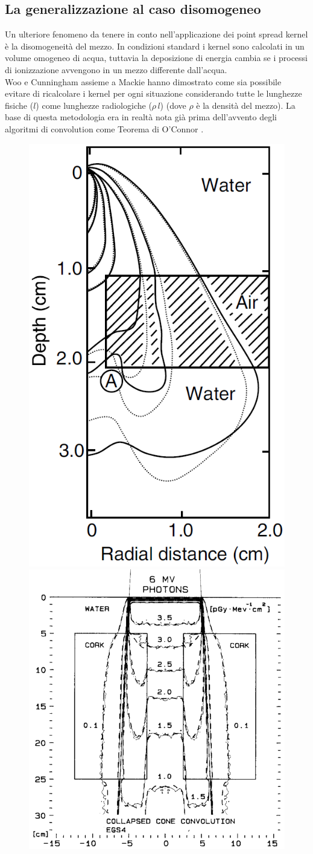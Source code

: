 {\subsection{La generalizzazione al caso disomogeneo}
Un ulteriore fenomeno da tenere in conto nell'applicazione dei point spread kernel è la disomogeneità del mezzo. In condizioni standard i kernel sono calcolati in un volume omogeneo di acqua, tuttavia la deposizione di energia cambia se i processi di ionizzazione avvengono in un mezzo differente dall'acqua.\\
Woo e Cunningham \cite{Woo1990} assieme a Mackie \cite{Mackie1985} hanno dimostrato come sia possibile evitare di ricalcolare i kernel per ogni situazione considerando tutte le lunghezze fisiche ($l$) come lunghezze radiologiche ($\rho\,l$) (dove $\rho$ è la densità del mezzo). La base di questa metodologia era in realtà nota già prima dell'avvento degli algoritmi di convolution come Teorema di O'Connor \cite{OConnor1957}.\\
\begin{figure}[!t]
\centering
\includegraphics[width=.4\textwidth]{./cap1/kern_dens.png}
\includegraphics[width=.59\textwidth]{./cap1/kern_dens2.png}

\end{figure}}
